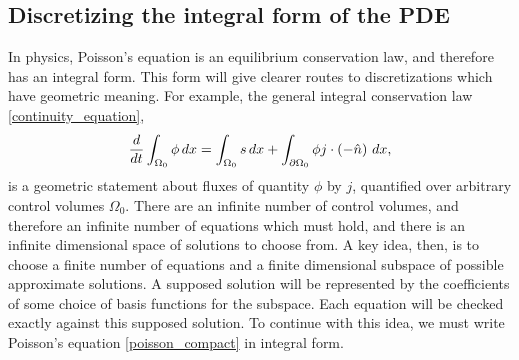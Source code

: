 
\subsection{Discretizing the integral form of the PDE}
In physics, Poisson's equation is an equilibrium conservation law, and therefore has an integral form.
This form will give clearer routes to discretizations which
have geometric meaning.
For example, the general integral conservation law \eqref{continuity_equation},
\begin{align*}
    \frac{d}{dt} \int_{\Omega_0} \phi\,dx = \int_{\Omega_0} s\,dx + \int_{{\partial\Omega_0}} \phi j \cdot \left(-\hat{n}\right)\,dx,
\end{align*}
is a geometric statement about fluxes
of quantity $\phi$ by $j$, quantified over arbitrary control volumes $\Omega_0$.
There are an infinite number of control volumes, and therefore an infinite number of equations which must hold, and there is an infinite dimensional
space of solutions to choose from. A key idea, then, is to choose a finite number of equations and a finite dimensional subspace of possible approximate solutions.
A supposed solution will be represented by the coefficients of some choice of basis functions for the subspace. Each equation will be checked exactly against this supposed solution.
To continue with this idea, we must write Poisson's equation \eqref{poisson_compact} in integral form.

% 


